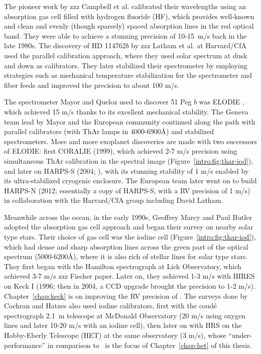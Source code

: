 The pioneer work by zzz Campbell et al. calibrated their wavelengths
using an absorption gas cell filled with hydrogen fluoride (HF), which
provides well-known and clean and evenly (though sparsely) spaced
absorption lines in the red optical band. They were able to achieve a
stunning precision of 10-15~m/s back in the late 1980s. The discovery
of HD 114762$b$ by zzz Latham et al. at Harvard/CfA used the parallel
calibration approach, where they used solar spectrum at dusk and down
as calibrators. They later stabilized their spectrometer by employing
strategies such as mechanical temperature stabilization for the
spectrometer and fiber feeds and improved the precision to about 100
m/s.

The spectrometer Mayor and Queloz used to discover 51 Peg $b$ was
ELODIE \citep{elodie}, which achieved 15 m/s thanks to its excellent
mechanical stability. The Geneva team lead by Mayor and the European
community continued along the path with parallel calibrators (with
ThAr lamps in 4000-6900\AA) and stabilized spectrometers. More and
more exoplanet discoveries are made with two successors of ELODIE:
first CORALIE (1999), which achieved 2-7 m/s precision using
simultaneous ThAr calibration in the spectral image
(Figure~\ref{intro:fig:thar-iod}), and later on HARPS-S (2004;
\citealt{harps-s}), with its stunning stability of 1 m/s enabled by
its ultra-stabilized cryogenic enclosure. The European team later went
on to build HARPS-N (2012; essentially a copy of HARPS-S, with a RV
precision of 1 m/s) in collaboration with the Harvard/CfA group
including David Latham.

Meanwhile across the ocean, in the early 1990s, Geoffrey Marcy and
Paul Butler adopted the absorption gas cell approach and began their
survey on nearby solar type stars. Their choice of gas cell was the
iodine cell (Figure~\ref{intro:fig:thar-iod}), which had dense and sharp absorption lines across the
green part of the optical spectrum (5000-6200\AA), where it is also
rich of stellar lines for solar type stars. They first began with the
Hamilton spectrograph at Lick Observatory, which achieved 3-7 m/s zzz
Fischer paper. Later on, they achieved 1-3 m/s with HIRES on Keck I
(1996; then in 2004, a CCD upgrade brought the precision to 1-2
m/s). Chapter~\ref{chap:keck} is on improving the RV precision of
\keck. The surveys done by Cochran and Hatzes also used iodine
calibrators, first with the coud\'e spectrograph 2.1~m telescope at
McDonald Observatory (20 m/s using oxygen lines and later 10-20 m/s
with an iodine cell), then later on with HRS on the Hobby-Eberly
Telescope (HET) at the same observatory (3 m/s), whose
``under-performance'' in comparison to \keck\ is the focus of
Chapter~\ref{chap:het} of this thesis.

